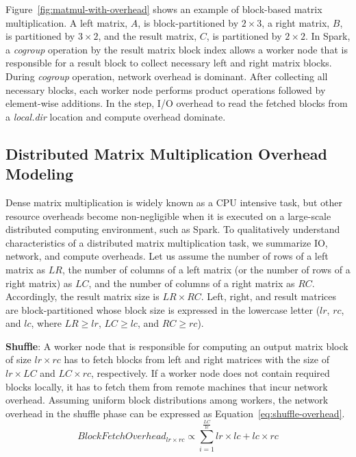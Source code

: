 \documentclass[10pt, conference, compsocconf]{IEEEtran}
\begin{document}
Figure~\ref{fig:matmul-with-overhead} shows an example of block-based matrix multiplication. A left matrix, $A$, is block-partitioned by $2 \times 3$, a right matrix, $B$, is partitioned by $3 \times 2$, and the result matrix, $C$, is partitioned by $2 \times 2$. In Spark, a \textit{cogroup} operation by the result matrix block index allows a worker node that is responsible for a result block to collect necessary left and right matrix blocks. During \textit{cogroup} operation, network overhead is dominant. After collecting all necessary blocks, each worker node performs product operations followed by element-wise additions. In the step, I/O overhead to read the fetched blocks from a \textit{local.dir} location and compute overhead dominate.

\subsection{Distributed Matrix Multiplication Overhead Modeling}\label{sec:overhead-modeling}
Dense matrix multiplication is widely known as a CPU intensive task, but other resource overheads become non-negligible when it is executed on a large-scale distributed computing environment, such as Spark. To qualitatively understand characteristics of a distributed matrix multiplication task, we summarize IO, network, and compute overheads. Let us assume the number of rows of a left matrix as $LR$, the number of columns of a left matrix (or the number of rows of a right matrix) as $LC$, and the number of columns of a right matrix as $RC$. Accordingly, the result matrix size is $LR \times RC$. Left, right, and result matrices are block-partitioned whose block size is expressed in the lowercase letter ($lr$, $rc$, and $lc$, where $LR \geq lr$, $LC \geq lc$, and $RC \geq rc$). 

\textbf{Shuffle}: A worker node that is responsible for computing an output matrix block of size $lr \times rc$ has to fetch blocks from left and right matrices with the size of $lr \times LC$ and $LC \times rc$, respectively. If a worker node does not contain required blocks locally, it has to fetch them from remote machines that incur network overhead. Assuming uniform block distributions among workers, the network overhead in the shuffle phase can be expressed as Equation~\ref{eq:shuffle-overhead}.
\begin{equation}\label{eq:shuffle-overhead}
  BlockFetchOverhead_{lr \times rc} \propto \sum\limits_{i=1}^{\frac{LC}{lc}} lr \times lc + lc \times rc
\end{equation}
\end{document}
